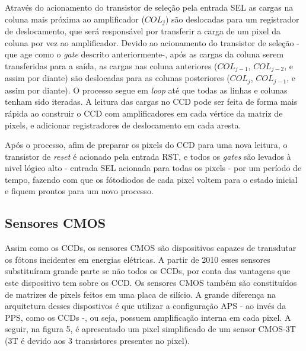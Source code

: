 \documentclass[10pt,a4paper,twocolumn]{article}
\begin{document}
	Através do acionamento do transistor de seleção pela entrada SEL as cargas na coluna mais próxima ao amplificador ($COL_{j}$) são deslocadas para um registrador de deslocamento, que será responsável por transferir a carga de um pixel da coluna por vez ao amplificador. Devido ao acionamento do transistor de seleção - que age como o \textit{gate} descrito anteriormente-, após as cargas da coluna serem transferidas para a saída, as cargas nas coluna anteriores ($COL_{j-1}$, $COL_{j-2}$, e assim por diante) são deslocadas para as colunas posteriores ($COL_{j}$, $COL_{j-1}$, e assim por diante). O processo segue em \textit{loop} até que todas as linhas e colunas tenham sido iteradas. A leitura das cargas no CCD pode ser feita de forma mais rápida ao construir o CCD com amplificadores em cada vértice da matriz de pixels, e adicionar registradores de deslocamento em cada aresta.
	
	Após o processo, afim de preparar os pixels do CCD para uma nova leitura, o transistor de \textit{reset} é acionado pela entrada RST, e todos os \textit{gates} são levados à nivel lógico alto - entrada SEL acionada para todas os pixels - por um período de tempo, fazendo com que os fótodiodos de cada pixel voltem para o estado inicial e fiquem prontos para um novo processo.
	
	\subsection*{Sensores CMOS}
	Assim  como os CCDs, os sensores CMOS são dispositivos capazes de transdutar os fótons incidentes em energias elétricas. A partir de 2010 esses sensores substituíram grande parte se não todos os CCDs, por conta das vantagens que este dispositivo tem sobre os CCD. Os sensores CMOS também são constituídos de matrizes de pixels feitos em uma placa de silício. A grande diferença na arquitetura desses dispostivos é que utilizar a configuração APS - ao invés da PPS, como os CCDs -, ou seja, possuem amplificação interna em cada pixel. A seguir, na figura 5, é apresentado um pixel simplificado de um sensor CMOS-3T (3T é devido aos 3 transistores presentes no pixel).
	
\end{document}
